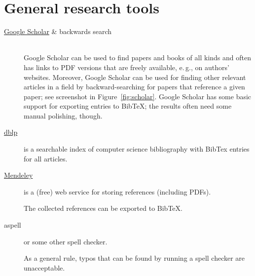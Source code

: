 \documentclass[]{rptuseminar}
\begin{document}
\section{General research tools}

\begin{description}
	\item[\href{http://scholar.google.com}{Google Scholar} \& backwards search]
		~\\ %
		Google Scholar can be used to find papers and books of all kinds and often has links to PDF versions that are freely available, e.\,g., on authors' websites.
		Moreover, Google Scholar can be used for finding other relevant articles in a field by backward-searching for papers that reference a given paper; see screenshot in Figure~\ref{fig:scholar}. %
		Google Scholar has some basic support for exporting entries to BibTeX; the results often need some manual polishing, though.


	\item[\href{http://dblp.uni-trier.de/}{dblp}] is a searchable index of computer science bibliography with BibTex entries for all articles.

	\item[\href{http://www.mendeley.com}{Mendeley}] is a (free) web service for storing references (including PDFs).

		The collected references can be exported to BibTeX.

	\item[aspell] or some other spell checker.

		As a general rule, typos that can be found by running a spell checker are unacceptable.


\end{description}
\end{document}
